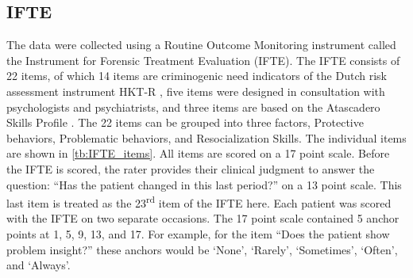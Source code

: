 \documentclass[a4paper,11pt]{article}
\newcommand{\DB}[1]{\todo[inline, color=colorDon,caption={}]{DB: {#1}}}
\begin{document}
\subsection{IFTE}
The data were collected using a Routine Outcome Monitoring instrument called the Instrument for Forensic Treatment Evaluation (IFTE).
The IFTE consists of 22 items, of which 14 items are criminogenic need indicators of the Dutch risk assessment instrument HKT-R \parencite{spreen2013handleiding}, five items were designed in consultation with psychologists and psychiatrists, and three items are based on the Atascadero Skills Profile \parencite{vess2001development}.
The 22 items can be grouped into three factors, Protective behaviors, Problematic behaviors, and Resocialization Skills.
The individual items are shown in \autoref{tb:IFTE_items}.
All items are scored on a 17 point scale.
Before the IFTE is scored, the rater provides their clinical judgment to answer the question: ``Has the patient changed in this last period?'' on a 13 point scale.
This last item is treated as the 23\textsuperscript{rd} item of the IFTE here.
Each patient was scored with the IFTE on two separate occasions.
The 17 point scale contained 5 anchor points at 1, 5, 9, 13, and 17.
For example, for the item ``Does the patient show problem insight?'' these anchors would be `None', `Rarely', `Sometimes', `Often', and `Always'.

\end{document}
